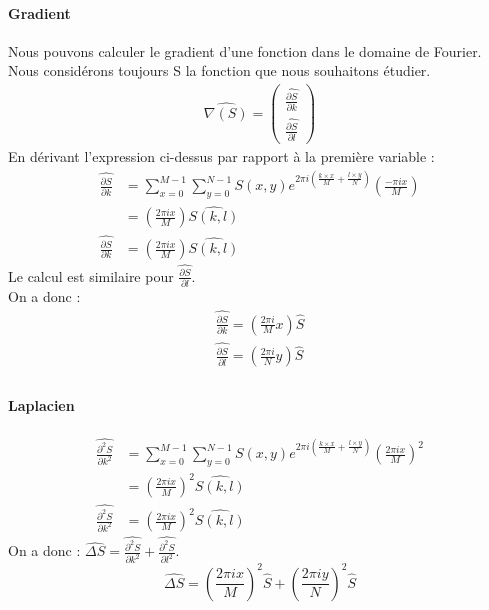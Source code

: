 \paragraph{Gradient}
Nous pouvons calculer le gradient d'une fonction dans le domaine de Fourier. Nous considérons toujours S la fonction que nous souhaitons étudier. 
\begin{equation}
\begin{aligned}
\widehat{\nabla (S)}=
\begin{pmatrix}
\widehat{\frac{\partial S}{\partial k}}\\
\widehat{\frac{\partial S}{\partial l}}
\end{pmatrix}
\end{aligned}
\end{equation}
En dérivant l'expression ci-dessus par rapport à la première variable : 
\begin{equation}
\begin{aligned}
\widehat{\frac{\partial S}{\partial k}} &= \sum_{x = 0}^{M-1} \sum_{y = 0}^{N-1} S(x,y) e^{2\pi i\left(\frac{k\times x}{M}+\frac{l\times y}{N}\right)}\left(\frac{-\pi i x}{M}\right)\\
& = \left(\frac{2\pi i x}{M}\right)\widehat{S(k,l)}\\
\widehat{\frac{\partial S}{\partial k}} &= \left(\frac{2\pi i x}{M}\right)\widehat{S(k,l)}
\end{aligned}
\end{equation}
Le calcul est similaire pour $\widehat{\frac{\partial S}{\partial l}}$.\\
On a donc : 
\begin{equation}
\begin{aligned}
\widehat{\frac{\partial S}{\partial k}} = \left(\frac{2\pi i}{M}x\right) \widehat{S}\\
\widehat{\frac{\partial S}{\partial l}} = \left(\frac{2\pi i}{N}y\right) \widehat{S}\\
\end{aligned}
\end{equation}

\paragraph{Laplacien}
\begin{equation}
\begin{aligned}
\widehat{\frac{\partial^2 S}{\partial k ^2}} & = \sum_{x = 0}^{M-1} \sum_{y = 0}^{N-1} S(x,y) e^{2\pi i\left(\frac{k\times x}{M}+\frac{l\times y}{N}\right)}\left(\frac{2\pi i x}{M}\right)^2\\
& = \left(\frac{2\pi i x}{M}\right)^2 \widehat{S(k,l)}\\
\widehat{\frac{\partial^2 S}{\partial k^2}} &= \left(\frac{2\pi i x}{M}\right)^2\widehat{S(k,l)}
\end{aligned}
\end{equation}
On a donc : 
$\widehat{\Delta S} = \widehat{\frac{\partial^2 S}{\partial k^2}}+ \widehat{\frac{\partial^2 S}{\partial l^2}}$.
\begin{equation}
\widehat{\Delta S} = \left(\frac{2\pi i x}{M}\right)^2 \widehat{S}+\left(\frac{2\pi i y}{N}\right)^2 \widehat{S}
\end{equation}

